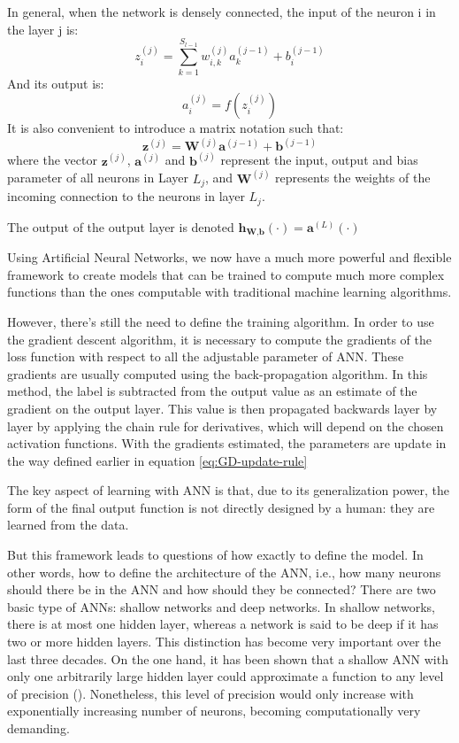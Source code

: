 In general, when the network is densely connected, the input of the neuron i in the layer j is:
\begin{equation}
z_i^{(j)} = \sum_{k=1}^{S_{l-1}} w_{i,k}^{(j)} a_k^{(j-1)} + b_i^{(j-1)}  
\end{equation}
And its output is:
\begin{equation}
a_i^{(j)} = f(z_i^{(j)})
\end{equation}
It is also convenient to introduce a matrix notation such that:
\begin{equation}
\textbf{z}^{(j)} = \textbf{W}^{(j)} \textbf{a}^{(j-1)} + \textbf{b}^{(j-1)}
\end{equation}
where the vector $\textbf{z}^{(j)}$, $\textbf{a}^{(j)}$ and $\textbf{b}^{(j)}$ represent the input, output and bias parameter of all neurons in Layer $L_j$, and $\mathbf{W}^{(j)}$ represents the weights of the incoming connection to the neurons in layer $L_j$.

The output of the output layer is denoted $\textbf{h}_{\textbf{W},\textbf{b}}\left( \cdot \right) = \textbf{a}^{(L)}\left( \cdot \right)$


Using Artificial Neural Networks, we now have a much more powerful and flexible framework to create models that can be trained to compute much more complex functions than the ones computable with traditional machine learning algorithms.

However, there's still the need to define the training algorithm. In order to use the gradient descent algorithm, it is necessary to compute the gradients of the loss function with respect to all the adjustable parameter of ANN. These gradients are usually computed using the back-propagation algorithm. In this method, the label is subtracted from the output value as an estimate of the gradient on the output layer. This value is then propagated backwards layer by layer by applying the chain rule for derivatives, which will depend on the chosen activation functions. With the gradients estimated, the parameters are update in the way defined earlier in equation \ref{eq:GD-update-rule}

The key aspect of learning with ANN is that, due to its generalization power, the form of the final output function is not directly designed by a human: they are learned from the data.

But this framework leads to questions of how exactly to define the model. In other words, how to define the architecture of the ANN, i.e., how many neurons should there be in the ANN and how should they be connected? There are two basic type of ANNs: shallow networks and deep networks. In shallow networks, there is at most one hidden layer, whereas a network is said to be deep if it has two or more hidden layers. This distinction has become very important over the last three decades. On the one hand, it has been shown that a shallow ANN with only one arbitrarily large hidden layer could approximate a function to any level of precision (\cite{hornik1989multilayer}). Nonetheless, this level of precision would only increase with exponentially increasing number of neurons, becoming computationally very demanding.

